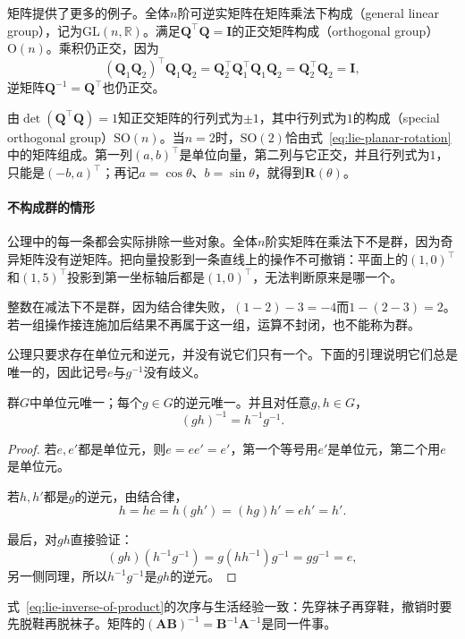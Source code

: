 矩阵提供了更多的例子。全体$n$阶可逆实矩阵在矩阵乘法下构成（general linear group），记为$\mathrm{GL}(n,\mathbb R)$。满足$\bm Q^\top\bm Q=\bm I$的正交矩阵构成（orthogonal group）$\mathrm O(n)$。乘积仍正交，因为
\[
(\bm Q_1\bm Q_2)^\top\bm Q_1\bm Q_2
=\bm Q_2^\top\bm Q_1^\top\bm Q_1\bm Q_2
=\bm Q_2^\top\bm Q_2=\bm I,
\]
逆矩阵$\bm Q^{-1}=\bm Q^\top$也仍正交。

由$\det(\bm Q^\top\bm Q)=1$知正交矩阵的行列式为$\pm1$，其中行列式为$1$的构成（special orthogonal group）$\mathrm{SO}(n)$。当$n=2$时，$\mathrm{SO}(2)$恰由式~\eqref{eq:lie-planar-rotation}中的矩阵组成。第一列$(a,b)^\top$是单位向量，第二列与它正交，并且行列式为$1$，只能是$(-b,a)^\top$；再记$a=\cos\theta$、$b=\sin\theta$，就得到$\bm R(\theta)$。

\paragraph{不构成群的情形}
公理中的每一条都会实际排除一些对象。全体$n$阶实矩阵在乘法下不是群，因为奇异矩阵没有逆矩阵。把向量投影到一条直线上的操作不可撤销：平面上的$(1,0)^\top$和$(1,5)^\top$投影到第一坐标轴后都是$(1,0)^\top$，无法判断原来是哪一个。

整数在减法下不是群，因为结合律失败，$(1-2)-3=-4$而$1-(2-3)=2$。若一组操作接连施加后结果不再属于这一组，运算不封闭，也不能称为群。

公理只要求存在单位元和逆元，并没有说它们只有一个。下面的引理说明它们总是唯一的，因此记号$e$与$g^{-1}$没有歧义。

\begin{lemma}[单位元与逆元的唯一性]
\label{lem:lie-identity-inverse-unique}
群$G$中单位元唯一；每个$g\in G$的逆元唯一。并且对任意$g,h\in G$，
\begin{equation}
 (gh)^{-1}=h^{-1}g^{-1}.
 \label{eq:lie-inverse-of-product}
\end{equation}
\end{lemma}

\begin{proof}
若$e,e'$都是单位元，则$e=ee'=e'$，第一个等号用$e'$是单位元，第二个用$e$是单位元。

若$h,h'$都是$g$的逆元，由结合律，
\[
h=he=h(gh')=(hg)h'=eh'=h'.
\]

最后，对$gh$直接验证：
\[
(gh)(h^{-1}g^{-1})=g(hh^{-1})g^{-1}=gg^{-1}=e,
\]
另一侧同理，所以$h^{-1}g^{-1}$是$gh$的逆元。
\end{proof}

式~\eqref{eq:lie-inverse-of-product}的次序与生活经验一致：先穿袜子再穿鞋，撤销时要先脱鞋再脱袜子。矩阵的$(\bm A\bm B)^{-1}=\bm B^{-1}\bm A^{-1}$是同一件事。

